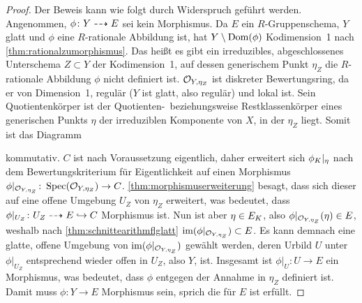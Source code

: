 \begin{Satz}
\begin{proof}
    Der Beweis kann wie folgt durch Widerspruch geführt werden.
    Angenommen, $\phi\colon Y\dashrightarrow E$ sei kein Morphismus.
    Da $E$ ein $R$-Gruppenschema, $Y$ glatt und $\phi$ eine
    $R$-rationale Abbildung ist, hat $Y\setminus\operatorname{Dom}(\phi)$
    Kodimension~1 nach \ref{thm:rationalzumorphismus}.
    Das heißt es gibt ein irreduzibles, abgeschlossenes Unterschema
    $Z\subset Y$ der Kodimension~1, auf dessen generischem Punkt
    $\eta_Z$ die $R$-rationale Abbildung $\phi$ nicht definiert ist.
    $\mathcal{O}_{Y,\eta_Z}$ ist diskreter Bewertungsring, da er von
    Dimension~1, regulär ($Y$ ist glatt, also
    regulär) und lokal ist.
    Sein Quotientenkörper ist der Quotienten-~beziehungsweise
    Restklassenkörper eines generischen Punkts $\eta$ der irreduziblen
    Komponente von $X$, in der $\eta_Z$ liegt. Somit ist das Diagramm
    \begin{center}
    \end{center}
    kommutativ.
    $C$ ist nach Voraussetzung eigentlich, daher erweitert sich
    $\phi_{K}|_{\eta}$ nach dem Bewertungskriterium für
    Eigentlichkeit auf einen Morphismus
    ${\phi|_{\mathcal{O}_{Y,\eta_Z}}\colon\operatorname{Spec}(\mathcal{O}_{Y,\eta_Z})\to C}$.
    \ref{thm:morphismuserweiterung} besagt, dass sich
    dieser auf eine offene Umgebung $U_Z$ von $\eta_Z$ erweitert,
    was bedeutet, dass ${\phi|_{U_Z}\colon U_Z\dashrightarrow E\hookrightarrow C}$
    Morphismus ist.
    Nun ist aber ${\eta\in E_{K}}$, also
    ${\phi|_{\mathcal{O}_{Y,\eta_Z}}(\eta)\in E}$, weshalb nach
    \ref{thm:schnittearithmflglatt}
    ${\operatorname{im}(\phi|_{\mathcal{O}_{Y,\eta_Z}})\subset E}$.
    Es kann demnach eine glatte, offene Umgebung von
    $\operatorname{im}(\phi|_{\mathcal{O}_{Y,\eta_Z}})$ gewählt werden, deren Urbild $U$ unter
    $\phi|_{U_Z}$ entsprechend wieder offen in $U_Z$, also $Y$, ist.
    Insgesamt ist ${\phi|_U\colon U\to E}$ ein Morphismus, was
    bedeutet, dass $\phi$ entgegen der Annahme in $\eta_Z$ definiert
    ist.
    Damit muss ${\phi\colon Y\to E}$ Morphismus sein, sprich die
    \NAbbEig für $E$ ist erfüllt.
    

\end{proof}
\end{Satz}
